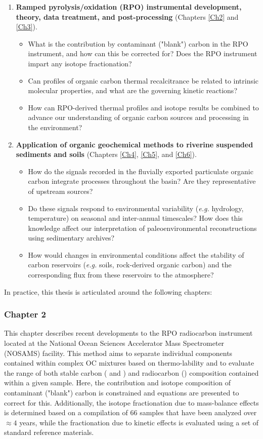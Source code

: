 \begin{enumerate}
\item \textbf{Ramped pyrolysis/oxidation (RPO) instrumental development, theory, data treatment, and post-processing} (Chapters \ref{Ch2} and \ref{Ch3}).
	\begin{itemize}
	\item What is the contribution by contaminant ("blank") carbon in the RPO instrument, and how can this be corrected for? Does the RPO instrument impart any isotope fractionation?
	\item Can profiles of organic carbon thermal recalcitrance be related to intrinsic molecular properties, and what are the governing kinetic reactions?
	\item How can RPO-derived thermal profiles and isotope results be combined to advance our understanding of organic carbon sources and processing in the environment?  
	\end{itemize}
\item \textbf{Application of organic geochemical methods to riverine suspended sediments and soils} (Chapters \ref{Ch4}, \ref{Ch5}, and \ref{Ch6}).
	\begin{itemize}
	\item How do the signals recorded in the fluvially exported particulate organic carbon integrate processes throughout the basin? Are they representative of upstream sources?
	\item Do these signals respond to environmental variability (\textit{e.g.} hydrology, temperature) on seasonal and inter-annual timescales? How does this knowledge affect our interpretation of paleoenvironmental reconstructions using sedimentary archives?
	\item How would changes in environmental conditions affect the stability of carbon reservoirs (\textit{e.g.} soils, rock-derived organic carbon) and the corresponding  flux from these reservoirs to the atmosphere?
	\end{itemize}
\end{enumerate}

In practice, this thesis is articulated around the following chapters:

\subsubsection{Chapter 2}

This chapter describes recent developments to the RPO radiocarbon instrument located at the National Ocean Sciences Accelerator Mass Spectrometer (NOSAMS) facility. This method aims to separate individual components contained within complex OC mixtures based on thermo-lability and to evaluate the range of both stable carbon ( and ) and radiocarbon () composition contained within a given sample. Here, the contribution and isotope composition of contaminant ("blank") carbon is constrained and equations are presented to correct for this. Additionally, the isotope fractionation due to mass-balance effects is determined based on a compilation of 66 samples that have been analyzed over $\approx 4$ years, while the fractionation due to kinetic effects is evaluated using a set of standard reference materials. 

